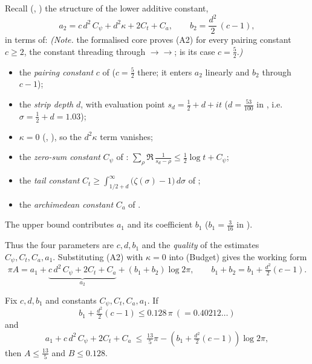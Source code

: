Recall (, ) the
structure of the lower additive constant,
\begin{equation}
  a_2=c\,d^2\,C_\psi+d^2\kappa+2C_t+C_a,
  \qquad
  b_2=\frac{d^2}{2}\,(c-1),
  \tag{A2}
  \label{eq:ls_a2}
\end{equation}
in terms of:
\emph{(Note.} the formalised core  proves
\textup{(A2)} for every pairing constant $c\ge2$, the constant threading through
$\to$$\to$;
 is its case $c=\tfrac52$.\emph{)}
\begin{itemize}
  \item the \emph{pairing constant} $c$ of  ($c=\tfrac52$ there;
        it enters $a_2$ linearly and $b_2$ through $c-1$);
  \item the \emph{strip depth} $d$, with evaluation point $s_d=\tfrac12+d+it$
        ($d=\tfrac{53}{100}$ in , i.e.\ $\sigma=\tfrac12+d=1.03$);
  \item $\kappa=0$ (, ),
        so the $d^2\kappa$ term vanishes;
  \item the \emph{zero-sum constant} $C_\psi$ of :
        $\sum_\rho\Re\,\tfrac1{s_d-\rho}\le\tfrac12\log t+C_\psi$;
  \item the \emph{tail constant} $C_t\ge\int_{1/2+d}^\infty\!\bigl(\zeta(\sigma)-1\bigr)\,d\sigma$
        of ;
  \item the \emph{archimedean constant} $C_a$ of .
\end{itemize}
The upper bound contributes $a_1$ and its coefficient $b_1$ ($b_1=\tfrac3{16}$ in
).

Thus the four parameters are $c,d,b_1$ and the \emph{quality} of the estimates
$C_\psi,C_t,C_a,a_1$. Substituting \textup{(A2)} with $\kappa=0$ into
\textup{(Budget)} gives the working form
\begin{equation}
  \pi A=a_1+\underbrace{c\,d^2\,C_\psi+2C_t+C_a}_{a_2}
        +(b_1+b_2)\log 2\pi,
  \qquad
  b_1+b_2=b_1+\tfrac{d^2}2(c-1).
  \tag{$\star$}
  \label{eq:ls_master}
\end{equation}

\begin{lemma}
\label{lem:ls_feasible}
Fix $c,d,b_1$ and constants $C_\psi,C_t,C_a,a_1$. If
\begin{equation}
  b_1+\tfrac{d^2}2(c-1)\le 0.128\,\pi\ (=0.40212\ldots)
  \tag{Shape}
  \label{eq:ls_shape}
\end{equation}
and
\begin{equation}
  a_1+c\,d^2\,C_\psi+2C_t+C_a\ \le\ \tfrac{13}{5}\pi-(b_1+\tfrac{d^2}2(c-1))\log 2\pi,
  \tag{Add}
  \label{eq:ls_add}
\end{equation}
then $A\le\tfrac{13}{5}$ and $B\le 0.128$.
\end{lemma}

